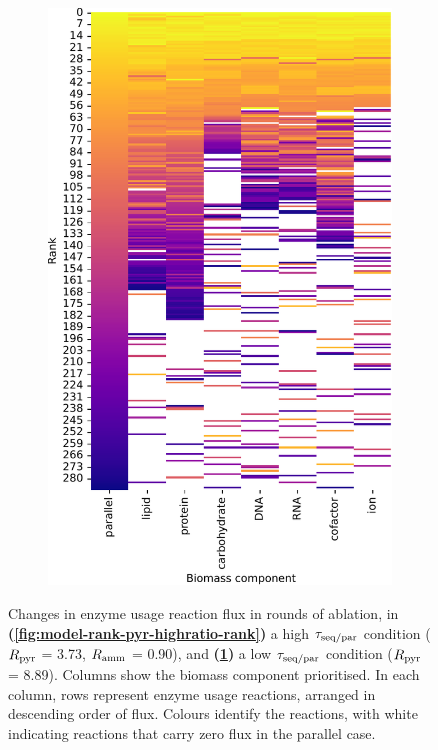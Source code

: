 \begin{figure}
  \begin{subfigure}[t]{0.45\textwidth}
  \centering
    \includegraphics[width=\linewidth]{CompareEnzUse_glc00p00_pyr08p89_ammUnres_1.pdf}
    \caption{
    }
    \label{fig:model-rank-pyr-lowratio-rank}
  \end{subfigure}

  \caption[
    Changes in enzyme usage reaction flux in rounds of ablation (pyruvate-ammonium)
  ]{
    Changes in enzyme usage reaction flux in rounds of ablation, in  \textbf{(\ref{fig:model-rank-pyr-highratio-rank})} a high $\tau_{\mathrm{seq}/\mathrm{par}}$ condition ($R_{\mathrm{pyr}}$ = \SI{3.73}{\mmolgdwh}, $R_{\mathrm{amm}}$ = \SI{0.90}{\mmolgdwh}), and \textbf{(\ref{fig:model-rank-pyr-lowratio-rank})} a low $\tau_{\mathrm{seq}/\mathrm{par}}$ condition ($R_{\mathrm{pyr}}$ = \SI{8.89}{\mmolgdwh}).
    Columns show the biomass component prioritised.
    In each column, rows represent enzyme usage reactions, arranged in descending order of flux.
    Colours identify the reactions, with white indicating reactions that carry zero flux in the parallel case.
  }
  \label{fig:model-rank-pyr-rank}
\end{figure}

